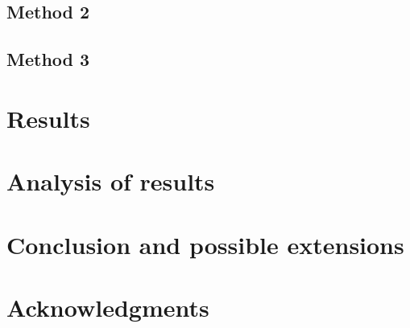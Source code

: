 \documentclass{article} %
\begin{document}
\subsection{Method 2}
\subsection{Method 3}

\section{Results}

\section{Analysis of results}

\section{Conclusion and possible extensions}

\section{Acknowledgments}


\end{document}

